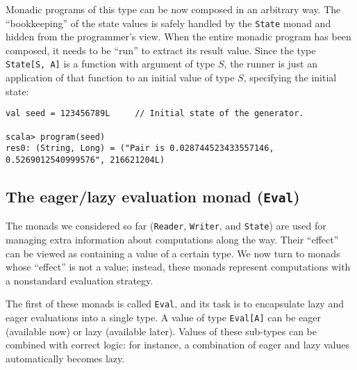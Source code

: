 Monadic programs of this type can be now composed in an arbitrary
way. The \textsf{``}bookkeeping\textsf{''} of the state values is safely handled by
the \lstinline!State! monad and hidden from the programmer\textsf{'}s view.
When the entire monadic program has been composed, it needs to be
\textsf{``}run\textsf{''} to extract its result value. Since the type \lstinline!State[S, A]!
is a function with argument of type $S$, the runner
is just an application of that function to an initial value of type
$S$, specifying the initial state:
\begin{lstlisting}
val seed = 123456789L     // Initial state of the generator.

scala> program(seed)
res0: (String, Long) = ("Pair is 0.028744523433557146, 0.5269012540999576", 216621204L)
\end{lstlisting}


\subsection{The eager/lazy evaluation monad (\texttt{Eval})}

The monads we considered so far (\lstinline!Reader!, \lstinline!Writer!,
and \lstinline!State!) are used for managing extra information about
computations along the way. Their \textsf{``}effect\textsf{''} can be viewed as containing
a value of a certain type. We now turn to monads whose \textsf{``}effect\textsf{''}
is not a value; instead, these monads represent computations with
a nonstandard evaluation strategy. 

The first of these monads is called \lstinline!Eval!, and its task
is to encapsulate lazy and eager evaluations into a single type. A
value of type \lstinline!Eval[A]! can be eager (available now) or
lazy (available later). Values of these sub-types can be combined
with correct logic: for instance, a combination of eager and lazy
values automatically becomes lazy.

